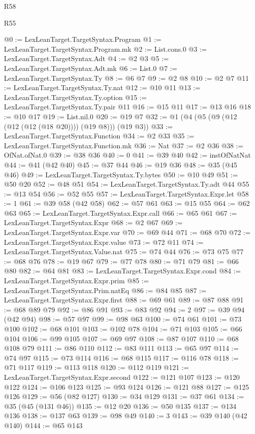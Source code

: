 \begin{lexlean}{R58}
\begin{lexlean}{R55}
\begin{coremodule}
{{{{{{{{{{{{{{{{{{{{{{{{{{{{{{{{{{{{{{{{{{{{{{{{{{{{{{{{{{{{@0 := LexLeanTarget.TargetSyntax.Program
@1 := LexLeanTarget.TargetSyntax.Program.mk
@2 := List.cons.{0}
@3 := LexLeanTarget.TargetSyntax.Adt
@4 := @2 @3
@5 := LexLeanTarget.TargetSyntax.Adt.mk
@6 := List.{0}
@7 := LexLeanTarget.TargetSyntax.Ty
@8 := @6 @7
@9 := @2 @8
@10 := @2 @7
@11 := LexLeanTarget.TargetSyntax.Ty.nat
@12 := @10 @11
@13 := LexLeanTarget.TargetSyntax.Ty.option
@15 := LexLeanTarget.TargetSyntax.Ty.pair @11
@16 := @15 @11
@17 := @13 @16
@18 := @10 @17
@19 := List.nil.{0}
@20 := @19 @7
@32 := @1 (@4 (@5 (@9 (@12 (@12 (@12 (@18 @20)))) (@19 @8))) (@19 @3))
@33 := LexLeanTarget.TargetSyntax.Function
@34 := @2 @33
@35 := LexLeanTarget.TargetSyntax.Function.mk
@36 := Nat
@37 := @2 @36
@38 := OfNat.ofNat.{0}
@39 := @38 @36
@40 := 0
@41 := @39 @40
@42 := instOfNatNat
@44 := @41 (@42 @40)
@45 := @37 @44
@46 := @19 @36
@48 := @35 (@45 @46)
@49 := LexLeanTarget.TargetSyntax.Ty.bytes
@50 := @10 @49
@51 := @50 @20
@52 := @48 @51
@54 := LexLeanTarget.TargetSyntax.Ty.adt @44
@55 := @13 @54
@56 := @52 @55
@57 := LexLeanTarget.TargetSyntax.Expr.let
@58 := 1
@61 := @39 @58 (@42 @58)
@62 := @57 @61
@63 := @15 @55
@64 := @62 @63
@65 := LexLeanTarget.TargetSyntax.Expr.call
@66 := @65 @61
@67 := LexLeanTarget.TargetSyntax.Expr
@68 := @2 @67
@69 := LexLeanTarget.TargetSyntax.Expr.var
@70 := @69 @44
@71 := @68 @70
@72 := LexLeanTarget.TargetSyntax.Expr.value
@73 := @72 @11
@74 := LexLeanTarget.TargetSyntax.Value.nat
@75 := @74 @44
@76 := @73 @75
@77 := @68 @76
@78 := @19 @67
@79 := @77 @78
@80 := @71 @79
@81 := @66 @80
@82 := @64 @81
@83 := LexLeanTarget.TargetSyntax.Expr.cond
@84 := LexLeanTarget.TargetSyntax.Expr.prim
@85 := LexLeanTarget.TargetSyntax.Prim.natEq
@86 := @84 @85
@87 := LexLeanTarget.TargetSyntax.Expr.first
@88 := @69 @61
@89 := @87 @88
@91 := @68 @89 @79
@92 := @86 @91
@93 := @83 @92
@94 := 2
@97 := @39 @94 (@42 @94)
@98 := @57 @97
@99 := @98 @63
@100 := @74 @61
@101 := @73 @100
@102 := @68 @101
@103 := @102 @78
@104 := @71 @103
@105 := @66 @104
@106 := @99 @105
@107 := @69 @97
@108 := @87 @107
@110 := @68 @108 @79
@111 := @86 @110
@112 := @83 @111
@113 := @65 @97
@114 := @74 @97
@115 := @73 @114
@116 := @68 @115
@117 := @116 @78
@118 := @71 @117
@119 := @113 @118
@120 := @112 @119
@121 := LexLeanTarget.TargetSyntax.Expr.second
@122 := @121 @107
@123 := @120 @122
@124 := @106 @123
@125 := @93 @124
@126 := @121 @88
@127 := @125 @126
@129 := @56 (@82 @127)
@130 := @34 @129
@131 := @37 @61
@134 := @35 (@45 (@131 @46))
@135 := @12 @20
@136 := @50 @135
@137 := @134 @136
@138 := @137 @63
@139 := @98 @49
@140 := 3
@143 := @39 @140 (@42 @140)
@144 := @65 @143
}}}}}}}}}}}}}}}}}}}}}}}}}}}}}}}}}}}}}}}}}}}}}}}}}}}}}}}}}}}}
\end{coremodule}
\end{lexlean}
\end{lexlean}
